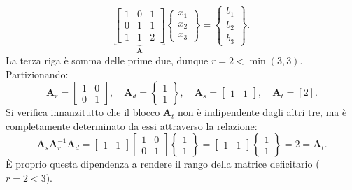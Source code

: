 \begin{equation}
	\underbrace{\begin{bmatrix} 1 & 0 & 1 \\ 0 & 1 & 1 \\ 1 & 1 & 2 \end{bmatrix}}_{\bm{A}}
	\begin{Bmatrix} x_1 \\ x_2 \\ x_3 \end{Bmatrix}
	= \begin{Bmatrix} b_1 \\ b_2 \\ b_3 \end{Bmatrix}.
\end{equation}
La terza riga \`e somma delle prime due, dunque $r=2<\min(3,3)$. Partizionando:
\begin{equation}
	\bm{A}_r = \begin{bmatrix} 1 & 0 \\ 0 & 1 \end{bmatrix}, \quad
	\bm{A}_d = \begin{Bmatrix} 1 \\ 1 \end{Bmatrix}, \quad
	\bm{A}_s = \begin{bmatrix} 1 & 1 \end{bmatrix}, \quad
	\bm{A}_t = [2].
\end{equation}
\noindent Si verifica innanzitutto che il blocco $\bm{A}_t$ non \`e
indipendente dagli altri tre, ma \`e completamente determinato da essi
attraverso la relazione:
\begin{equation}
	\bm{A}_s\bm{A}_r^{-1}\bm{A}_d
	= \begin{bmatrix} 1 & 1 \end{bmatrix}
	\begin{bmatrix} 1 & 0 \\ 0 & 1 \end{bmatrix}
	\begin{Bmatrix} 1 \\ 1 \end{Bmatrix}
	= \begin{bmatrix} 1 & 1 \end{bmatrix}
	\begin{Bmatrix} 1 \\ 1 \end{Bmatrix}
	= 2 = \bm{A}_t.
\end{equation}
\`E proprio questa dipendenza a rendere il rango della matrice
deficitario ($r=2<3$).

